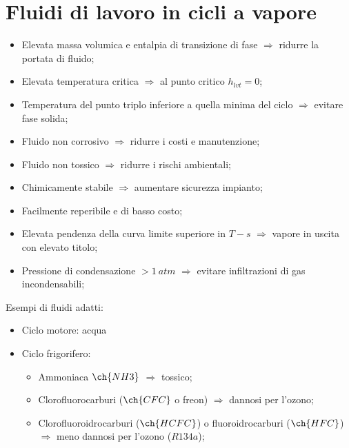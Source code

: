 \section{Fluidi di lavoro in cicli a vapore}

\begin{itemize}
    \item Elevata massa volumica e entalpia di transizione di fase $\Rightarrow$ ridurre la portata di fluido;
    \item Elevata temperatura critica $\Rightarrow$ al punto critico $h_{lvt} = 0$;
    \item Temperatura del punto triplo inferiore a quella minima del ciclo $\Rightarrow$ evitare fase solida;
    \item Fluido non corrosivo $\Rightarrow$ ridurre i costi e manutenzione;
    \item Fluido non tossico $\Rightarrow$ ridurre i rischi ambientali;
    \item Chimicamente stabile $\Rightarrow$ aumentare sicurezza impianto;
    \item Facilmente reperibile e di basso costo;
    \item Elevata pendenza della curva limite superiore in $T-s$ $\Rightarrow$ vapore in uscita con elevato titolo;
    \item Pressione di condensazione $> \SI{1}{atm}$ $\Rightarrow$ evitare infiltrazioni di gas incondensabili;
\end{itemize}

Esempi di fluidi adatti:

\begin{itemize}
    \item Ciclo motore: acqua
    \item Ciclo frigorifero:
    \begin{itemize}
        \item Ammoniaca $\ch{NH3}$ $\Rightarrow$ tossico;
        \item Clorofluorocarburi ($\ch{CFC}$ o freon) $\Rightarrow$ dannosi per l'ozono;
        \item Clorofluoroidrocarburi ($\ch{HCFC}$) o fluoroidrocarburi ($\ch{HFC}$) $\Rightarrow$ meno dannosi per l'ozono ($R134a$);
    \end{itemize}
\end{itemize}
